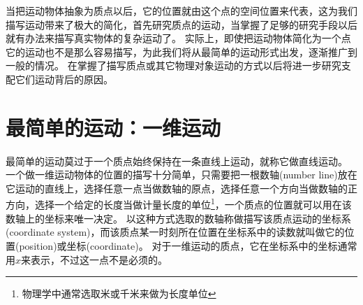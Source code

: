 当把运动物体抽象为质点以后，它的位置就由这个点的空间位置来代表，这为我们描写运动带来了极大的简化，首先研究质点的运动，当掌握了足够的研究手段以后就有办法来描写真实物体的复杂运动了。
实际上，即使把运动物体简化为一个点它的运动也不是那么容易描写，为此我们将从最简单的运动形式出发，逐渐推广到一般的情况。
在掌握了描写质点或其它物理对象运动的方式以后将进一步研究支配它们运动背后的原因。


\section{最简单的运动：一维运动}




最简单的运动莫过于一个质点始终保持在一条直线上运动，就称它做直线运动。
一个做一维运动物体的位置的描写十分简单，只需要把一根{\heiti 数轴}(number line)放在它运动的直线上，选择任意一点当做数轴的原点，选择任意一个方向当做数轴的正方向，选择一个给定的长度当做计量长度的单位\footnote{物理学中通常选取米或千米来做为长度单位}，一个质点的位置就可以用在该数轴上的坐标来唯一决定。
以这种方式选取的数轴称做描写该质点运动的{\heiti 坐标系(coordinate system)}，而该质点某一时刻所在位置在坐标系中的读数就叫做它的{\heiti 位置(position)}或{\heiti 坐标}(coordinate)。
对于一维运动的质点，它在坐标系中的坐标通常用$x$来表示，不过这一点不是必须的。


